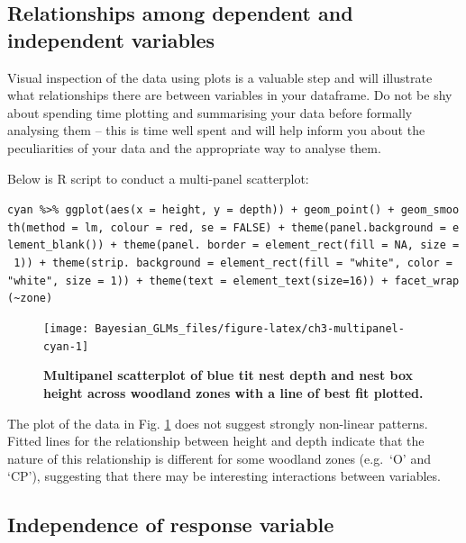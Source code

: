 \documentclass[
]{book}
\begin{document}
\hypertarget{relationships-among-dependent-and-independent-variables}{%
\subsection{Relationships among dependent and independent variables}\label{relationships-among-dependent-and-independent-variables}}

Visual inspection of the data using plots is a valuable step and will illustrate what relationships there are between variables in your dataframe. Do not be shy about spending time plotting and summarising your data before formally analysing them -- this is time well spent and will help inform you about the peculiarities of your data and the appropriate way to analyse them.

Below is R script to conduct a multi-panel scatterplot:

\texttt{cyan\ \%\textgreater{}\%\ ggplot(aes(x\ =\ height,\ y\ =\ depth))\ +\ geom\_point()\ +\ geom\_smooth(method\ =\ \textquotesingle{}lm\textquotesingle{},\ colour\ =\ \textquotesingle{}red\textquotesingle{},\ se\ =\ FALSE)\ +\ theme(panel.background\ =\ element\_blank())\ +\ theme(panel.\ border\ =\ element\_rect(fill\ =\ NA,\ size\ =\ 1))\ +\ theme(strip.\ background\ =\ element\_rect(fill\ =\ "white",\ color\ =\ "white",\ size\ =\ 1))\ +\ theme(text\ =\ element\_text(size=16))\ +\ facet\_wrap(\textasciitilde{}zone)}



\begin{figure}

{\centering \texttt{[image: Bayesian\_GLMs\_files/figure-latex/ch3-multipanel-cyan-1]} 

}

\caption{\textbf{Multipanel scatterplot of blue tit nest depth and nest box height across woodland zones with a line of best fit plotted.}}\label{fig:ch3-multipanel-cyan}
\end{figure}

The plot of the data in Fig. \ref{fig:ch3-multipanel-cyan} does not suggest strongly non-linear patterns. Fitted lines for the relationship between height and depth indicate that the nature of this relationship is different for some woodland zones (e.g.~`O' and `CP'), suggesting that there may be interesting interactions between variables.

\hypertarget{independence}{%
\subsection{Independence of response variable}\label{independence}}
\end{document}
